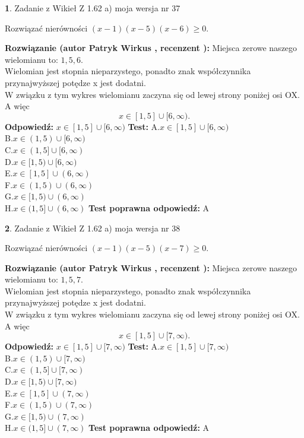 \documentclass[12pt, a4paper]{article}
\theoremstyle{definition} %
\newtheorem{zad}{}
\newcommand{\zadStart}[1]{\begin{zad}#1\newline}
\newcommand{\zadStop}{\end{zad}}
\newcommand{\rozwStart}[2]{\noindent \textbf{Rozwiązanie (autor #1 , recenzent #2): }\newline}
\newcommand{\rozwStop}{\newline}
\newcommand{\odpStart}{\noindent \textbf{Odpowiedź:}\newline}
\newcommand{\odpStop}{\newline}
\newcommand{\testStart}{\noindent \textbf{Test:}\newline}
\newcommand{\testStop}{\newline}
\newcommand{\kluczStart}{\noindent \textbf{Test poprawna odpowiedź:}\newline}
\newcommand{\kluczStop}{\newline}
\begin{document}
\zadStart{Zadanie z Wikieł Z 1.62 a) moja wersja nr 37}

Rozwiązać nierówności $(x-1)(x-5)(x-6)\ge0$.
\zadStop
\rozwStart{Patryk Wirkus}{}
Miejsca zerowe naszego wielomianu to: $1, 5, 6$.\\
Wielomian jest stopnia nieparzystego, ponadto znak współczynnika przy\linebreak najwyższej potędze x jest dodatni.\\ W związku z tym wykres wielomianu zaczyna się od lewej strony poniżej osi OX. A więc $$x \in [1,5] \cup [6,\infty).$$
\rozwStop
\odpStart
$x \in [1,5] \cup [6,\infty)$
\odpStop
\testStart
A.$x \in [1,5] \cup [6,\infty)$\\
B.$x \in (1,5) \cup [6,\infty)$\\
C.$x \in (1,5] \cup [6,\infty)$\\
D.$x \in [1,5) \cup [6,\infty)$\\
E.$x \in [1,5] \cup (6,\infty)$\\
F.$x \in (1,5) \cup (6,\infty)$\\
G.$x \in [1,5) \cup (6,\infty)$\\
H.$x \in (1,5] \cup (6,\infty)$
\testStop
\kluczStart
A
\kluczStop



\zadStart{Zadanie z Wikieł Z 1.62 a) moja wersja nr 38}

Rozwiązać nierówności $(x-1)(x-5)(x-7)\ge0$.
\zadStop
\rozwStart{Patryk Wirkus}{}
Miejsca zerowe naszego wielomianu to: $1, 5, 7$.\\
Wielomian jest stopnia nieparzystego, ponadto znak współczynnika przy\linebreak najwyższej potędze x jest dodatni.\\ W związku z tym wykres wielomianu zaczyna się od lewej strony poniżej osi OX. A więc $$x \in [1,5] \cup [7,\infty).$$
\rozwStop
\odpStart
$x \in [1,5] \cup [7,\infty)$
\odpStop
\testStart
A.$x \in [1,5] \cup [7,\infty)$\\
B.$x \in (1,5) \cup [7,\infty)$\\
C.$x \in (1,5] \cup [7,\infty)$\\
D.$x \in [1,5) \cup [7,\infty)$\\
E.$x \in [1,5] \cup (7,\infty)$\\
F.$x \in (1,5) \cup (7,\infty)$\\
G.$x \in [1,5) \cup (7,\infty)$\\
H.$x \in (1,5] \cup (7,\infty)$
\testStop
\kluczStart
A
\kluczStop
\end{document}
